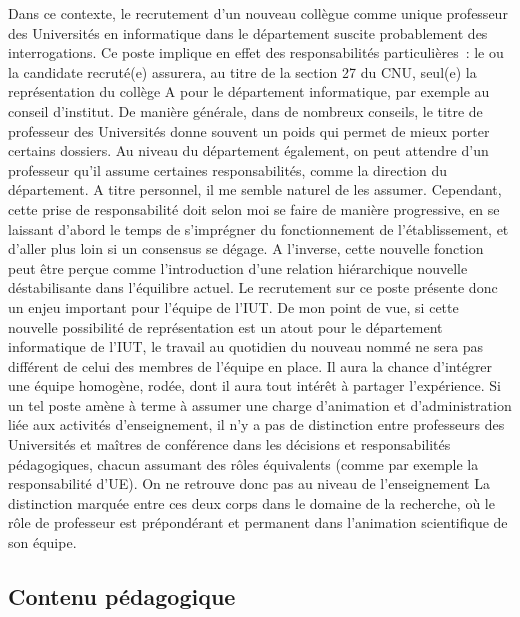 \documentclass[11pt]{article}
\begin{document}
Dans ce contexte, le recrutement d'un nouveau collègue comme unique professeur des Universités 
en informatique dans le département suscite probablement des interrogations. Ce poste implique 
en effet des responsabilités particulières~: le ou la candidate recruté(e) assurera, au titre 
de la section 27 du CNU, seul(e) la représentation du collège A pour le département informatique, 
par exemple au conseil d'institut. De manière générale, dans de nombreux conseils, le titre de 
professeur des Universités donne souvent un poids qui permet de mieux porter certains dossiers. 
Au niveau du département également, on peut attendre d'un professeur qu'il assume certaines 
responsabilités, comme la direction du département. A titre personnel, il me semble naturel de 
les assumer. Cependant, cette prise de responsabilité doit selon moi se faire de manière 
progressive, en se laissant d'abord le temps de s'imprégner du fonctionnement de l'établissement, 
et d'aller plus loin si un consensus se dégage.
A l'inverse, cette nouvelle fonction peut être perçue comme l'introduction d'une relation 
hiérarchique nouvelle déstabilisante dans l'équilibre actuel. Le recrutement sur ce poste 
présente donc un enjeu important pour l'équipe de l'IUT. De mon point de vue, si cette nouvelle 
possibilité de représentation est un atout pour le département informatique de l'IUT, le travail 
au quotidien du nouveau nommé ne sera pas différent de celui des membres de l'équipe en place. 
Il aura la chance d'intégrer une équipe homogène, rodée, dont il aura tout intérêt à partager 
l'expérience.  Si un tel poste amène à terme à assumer une charge d'animation et d'administration 
liée aux activités d'enseignement, il n'y a pas de distinction entre professeurs des Universités 
et maîtres de conférence dans les décisions et responsabilités pédagogiques, chacun assumant 
des rôles équivalents (comme par exemple la responsabilité d'UE). On ne retrouve donc pas au 
niveau de l'enseignement La distinction marquée entre ces deux corps dans le domaine de la 
recherche, où le rôle de professeur est prépondérant et permanent dans l'animation scientifique 
de son équipe. 


\subsection*{Contenu pédagogique}
\end{document}
